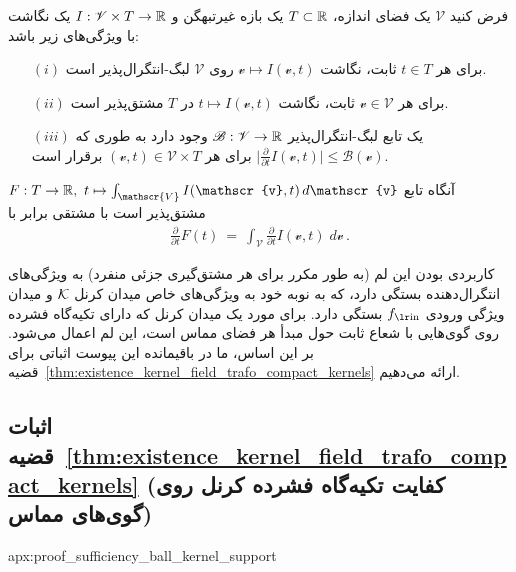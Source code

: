 \begin{thm}
\label{thm:differentiation_lemma}
    فرض کنید $\mathscr{V}$ یک فضای اندازه، $T\subset\mathbb{R}$ یک بازه غیرتبهگن و $I: \mathscr{V} \times T \to \mathbb{R}$ یک نگاشت با ویژگی‌های زیر باشد:
    \begin{itemize}
        \item[$(i)$] برای هر $t\in T$ ثابت، نگاشت $\mathscr{v} \mapsto I(\mathscr{v},t)$ روی $\mathscr{V}$ لبگ-انتگرال‌پذیر است.
        \item[$(ii)$] برای هر $\mathscr{v} \in \mathscr{V}$ ثابت، نگاشت $t\mapsto I(\mathscr{v},t)$ در $T$ مشتق‌پذیر است.
        \item[$(iii)$] یک تابع لبگ-انتگرال‌پذیر $\mathscr{B}: \mathscr{V} \to \mathbb{R}$ وجود دارد به طوری که
                $\big| \frac{\partial}{\partial t} I(\mathscr{v},t) \big| \leq \mathscr{B}(\mathscr{v})$
                برای هر $(\mathscr{v},t) \in \mathscr{V} \times T$ برقرار است.
    \end{itemize}
    آنگاه تابع $F: T \to \R,\ t \mapsto \int_\mathscr{V} I(\mathscr{v},t)\, d\mathscr{v}$ مشتق‌پذیر است
    با مشتقی برابر با
    \begin{align*}
        \frac{\partial}{\partial t} F(t)\ =\ \int_\mathscr{V} \frac{\partial}{\partial t} I(\mathscr{v},t)\; d\mathscr{v} \,.
    \end{align*}
\end{thm}
کاربردی بودن این لم (به طور مکرر برای هر مشتق‌گیری جزئی منفرد) به ویژگی‌های انتگرال‌دهنده بستگی دارد، که به نوبه خود به ویژگی‌های خاص میدان کرنل $\mathcal{K}$ و میدان ویژگی ورودی $\fin$ بستگی دارد.
برای مورد یک میدان کرنل که دارای تکیه‌گاه فشرده روی گوی‌هایی با شعاع ثابت حول مبدأ هر فضای مماس است، این لم اعمال می‌شود.
بر این اساس، ما در باقیمانده این پیوست اثباتی برای قضیه~\ref{thm:existence_kernel_field_trafo_compact_kernels} ارائه می‌دهیم.










\toclesslab\subsection{اثبات قضیه~\ref{thm:existence_kernel_field_trafo_compact_kernels} (کفایت تکیه‌گاه فشرده کرنل روی گوی‌های مماس)}{apx:proof_sufficiency_ball_kernel_support}

